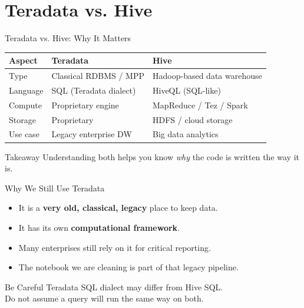 \documentclass[aspectratio=169,11pt]{beamer}
\begin{document}
	\section{Teradata vs. Hive}
	
	\begin{frame}{Teradata vs. Hive: Why It Matters}
		\begin{table}
			\centering
			\begin{tabular}{p{0.28\textwidth} p{} p{}}
				\toprule
				\textbf{Aspect} & \textbf{Teradata} & \textbf{Hive} \\
				\midrule
				Type & Classical RDBMS / MPP & Hadoop-based data warehouse \\
				Language & SQL (Teradata dialect) & HiveQL (SQL-like) \\
				Compute & Proprietary engine & MapReduce / Tez / Spark \\
				Storage & Proprietary & HDFS / cloud storage \\
				Use case & Legacy enterprise DW & Big data analytics \\
				\bottomrule
			\end{tabular}
		\end{table}
		
		\begin{block}{Takeaway}
			Understanding both helps you know \emph{why} the code is written the way it is.
		\end{block}
	\end{frame}
	
	\begin{frame}{Why We Still Use Teradata}
		\begin{itemize}
			\item It is a \textbf{very old, classical, legacy} place to keep data.
			\item It has its own \textbf{computational framework}.
			\item Many enterprises still rely on it for critical reporting.
			\item The notebook we are cleaning is part of that legacy pipeline.
		\end{itemize}
		
		\begin{alertblock}{Be Careful}
			Teradata SQL dialect may differ from Hive SQL.\\
			Do not assume a query will run the same way on both.
		\end{alertblock}
	\end{frame}
	
\end{document}
